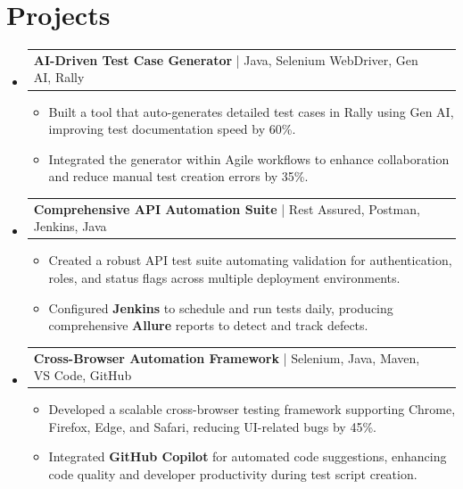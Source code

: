 \documentclass[letterpaper,11pt]{article}
\makeatletter
\newcommand{\resumeItem}[1]{
  \item\footnotesize{
    {#1 \vspace{-2pt}}
  }
}
\newcommand{\resumeProjectHeading}[2]{
    \item
    \begin{tabular*}{1.001\textwidth}{l@{\extracolsep{\fill}}r}
      \small#1 & \textbf{\small #2}\\
    \end{tabular*}\vspace{-7pt}
}
\newcommand{\resumeSubHeadingListStart}{\begin{itemize}[leftmargin=0pt, label={}]}
\newcommand{\resumeSubHeadingListEnd}{\end{itemize}}
\newcommand{\resumeItemListStart}{\begin{itemize}[leftmargin=*]}
\newcommand{\resumeItemListEnd}{\end{itemize}\vspace{-5pt}}
\makeatother
\begin{document}
\section{Projects}
    \vspace{-5pt}
    \resumeSubHeadingListStart
      \resumeProjectHeading
          {\textbf{AI-Driven Test Case Generator} | Java, Selenium WebDriver, Gen AI, Rally}{}
          \resumeItemListStart
              \resumeItem{Built a tool that auto-generates detailed test cases in Rally using Gen AI, improving test documentation speed by 60\%.}
              \resumeItem{Integrated the generator within Agile workflows to enhance collaboration and reduce manual test creation errors by 35\%.}
          \resumeItemListEnd
          \vspace{-12pt}
      \resumeProjectHeading
          {\textbf{Comprehensive API Automation Suite} | Rest Assured, Postman, Jenkins, Java}{}
          \resumeItemListStart
              \resumeItem{Created a robust API test suite automating validation for authentication, roles, and status flags across multiple deployment environments.}
              \resumeItem{Configured \textbf{Jenkins} to schedule and run tests daily, producing comprehensive \textbf{Allure} reports to detect and track defects.}
          \resumeItemListEnd
          \vspace{-12pt}
      \resumeProjectHeading
          {\textbf{Cross-Browser Automation Framework} | Selenium, Java, Maven, VS Code, GitHub}{}
          \resumeItemListStart
              \resumeItem{Developed a scalable cross-browser testing framework supporting Chrome, Firefox, Edge, and Safari, reducing UI-related bugs by 45\%.}
              \resumeItem{Integrated \textbf{GitHub Copilot} for automated code suggestions, enhancing code quality and developer productivity during test script creation.}
          \resumeItemListEnd 
    \resumeSubHeadingListEnd
\end{document}
